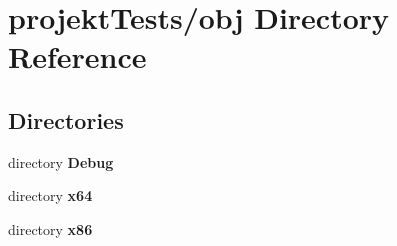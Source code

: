 \section{projekt\+Tests/obj Directory Reference}
\label{dir_67fc9f8b52b5ad90e43221124058927e}
\subsection*{Directories}
\begin{DoxyCompactItemize}
\item 
directory \textbf{ Debug}
\item 
directory \textbf{ x64}
\item 
directory \textbf{ x86}
\end{DoxyCompactItemize}

